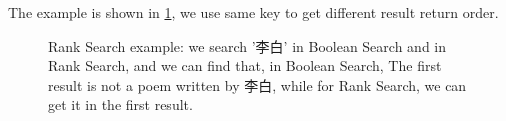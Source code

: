 The example is shown in \ref{search-8}, we use same key to get different result return order.


\begin{figure}[h]
\centering
{}

\caption{Rank Search example: we search '李白' in Boolean Search and in Rank Search, and we can find that, in Boolean Search, The first result is not a poem written by 李白, while for Rank Search, we can get it in the first result.}
\label{search-8}
\end{figure}